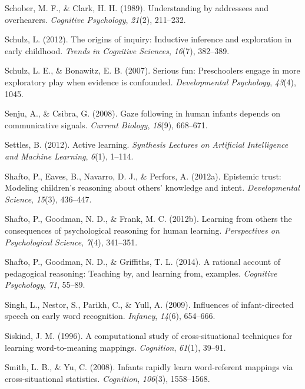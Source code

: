 \documentclass[english,floatsintext,man]{apa6}
\theoremstyle{definition}
\theoremstyle{definition}
\theoremstyle{definition}
\theoremstyle{remark}
\begin{document}
\hypertarget{ref-schober1989understanding}{}
Schober, M. F., \& Clark, H. H. (1989). Understanding by addressees and
overhearers. \emph{Cognitive Psychology}, \emph{21}(2), 211--232.

\hypertarget{ref-schulz2012origins}{}
Schulz, L. (2012). The origins of inquiry: Inductive inference and
exploration in early childhood. \emph{Trends in Cognitive Sciences},
\emph{16}(7), 382--389.

\hypertarget{ref-schulz2007serious}{}
Schulz, L. E., \& Bonawitz, E. B. (2007). Serious fun: Preschoolers
engage in more exploratory play when evidence is confounded.
\emph{Developmental Psychology}, \emph{43}(4), 1045.

\hypertarget{ref-senju2008gaze}{}
Senju, A., \& Csibra, G. (2008). Gaze following in human infants depends
on communicative signals. \emph{Current Biology}, \emph{18}(9),
668--671.

\hypertarget{ref-settles2012active}{}
Settles, B. (2012). Active learning. \emph{Synthesis Lectures on
Artificial Intelligence and Machine Learning}, \emph{6}(1), 1--114.

\hypertarget{ref-shafto2012epistemic}{}
Shafto, P., Eaves, B., Navarro, D. J., \& Perfors, A. (2012a). Epistemic
trust: Modeling children's reasoning about others' knowledge and intent.
\emph{Developmental Science}, \emph{15}(3), 436--447.

\hypertarget{ref-shafto2012learning}{}
Shafto, P., Goodman, N. D., \& Frank, M. C. (2012b). Learning from
others the consequences of psychological reasoning for human learning.
\emph{Perspectives on Psychological Science}, \emph{7}(4), 341--351.

\hypertarget{ref-shafto2014rational}{}
Shafto, P., Goodman, N. D., \& Griffiths, T. L. (2014). A rational
account of pedagogical reasoning: Teaching by, and learning from,
examples. \emph{Cognitive Psychology}, \emph{71}, 55--89.

\hypertarget{ref-singh2009influences}{}
Singh, L., Nestor, S., Parikh, C., \& Yull, A. (2009). Influences of
infant-directed speech on early word recognition. \emph{Infancy},
\emph{14}(6), 654--666.

\hypertarget{ref-siskind1996computational}{}
Siskind, J. M. (1996). A computational study of cross-situational
techniques for learning word-to-meaning mappings. \emph{Cognition},
\emph{61}(1), 39--91.

\hypertarget{ref-smith2008infants}{}
Smith, L. B., \& Yu, C. (2008). Infants rapidly learn word-referent
mappings via cross-situational statistics. \emph{Cognition},
\emph{106}(3), 1558--1568.
\end{document}

